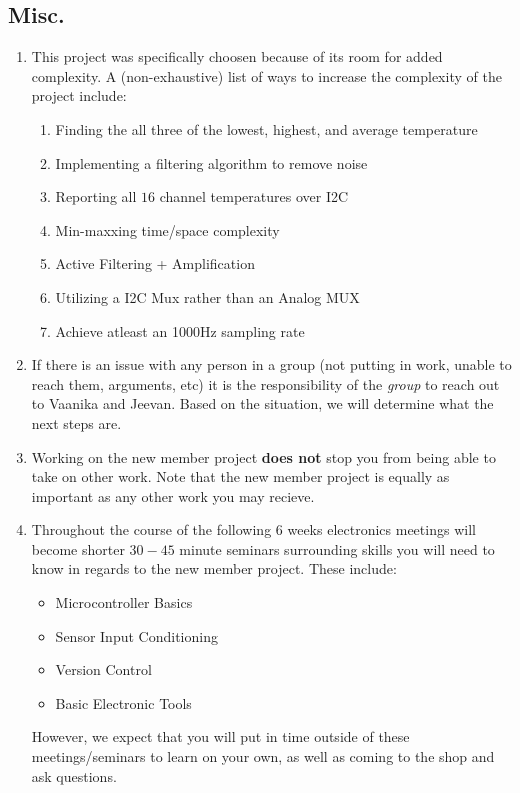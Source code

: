 \documentclass{article}
\begin{document}
    \subsection*{Misc.}
    \begin{enumerate}
        \item This project was specifically choosen because of its room for added complexity. A (non-exhaustive) list of ways to increase the complexity of the project include: 
        \begin{enumerate}
            \item Finding the all three of the lowest, highest, and average temperature 
            \item Implementing a filtering algorithm to remove noise 
            \item Reporting all $16$ channel temperatures over I2C 
            \item Min-maxxing time/space complexity 
            \item Active Filtering + Amplification 
            \item Utilizing a I2C Mux rather than an Analog MUX
            \item Achieve atleast an 1000Hz sampling rate 
        \end{enumerate}

        \item If there is an issue with any person in a group (not putting in work, unable to reach them, arguments, etc) it is the responsibility of the \textit{group} to reach out to Vaanika and Jeevan. Based on the situation, we will determine what the next steps are.
        
        \item Working on the new member project \textbf{does not} stop you from being able to take on other work. Note that the new member project is equally as important as any other work you may recieve.
        
        \item Throughout the course of the following $6$ weeks electronics meetings will become shorter $30-45$ minute seminars surrounding skills you will need to know in regards to the new member project. These include: 
        \begin{itemize}
            \item Microcontroller Basics
            \item Sensor Input Conditioning
            \item Version Control 
            \item Basic Electronic Tools
        \end{itemize}
        However, we expect that you will put in time outside of these meetings/seminars to learn on your own, as well as coming to the shop and ask questions. 


\end{enumerate}
\end{document}
